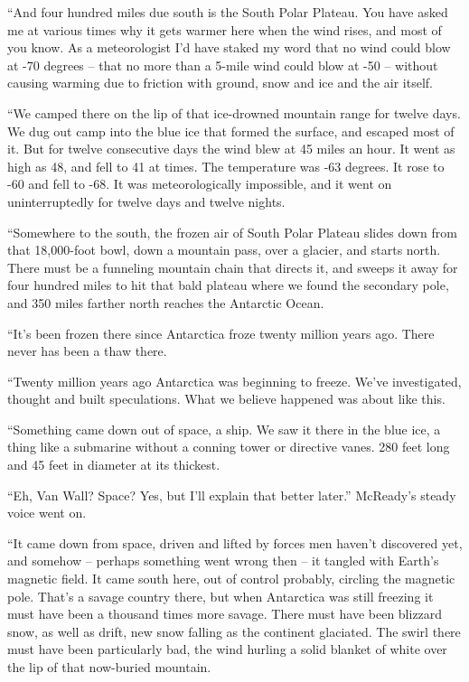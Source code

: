 \documentclass[letterpaper,openany,12pt]{memoir}		%
\begin{document}
``And four hundred miles due south is the South Polar Plateau. You have asked me
at various times why it gets warmer here when the wind rises, and most of you
know. As a meteorologist I'd have staked my word that no wind could blow at -70
degrees -- that no more than a 5-mile wind could blow at -50 -- without causing
warming due to friction with ground, snow and ice and the air itself.

``We camped there on the lip of that ice-drowned mountain range for twelve days.
We dug out camp into the blue ice that formed the surface, and escaped most of
it. But for twelve consecutive days the wind blew at 45 miles an hour. It went
as high as 48, and fell to 41 at times. The temperature was -63 degrees. It rose
to -60 and fell to -68. It was meteorologically impossible, and it went on
uninterruptedly for twelve days and twelve nights.

``Somewhere to the south, the frozen air of South Polar Plateau slides down from
that 18,000-foot bowl, down a mountain pass, over a glacier, and starts north.
There must be a funneling mountain chain that directs it, and sweeps it away for
four hundred miles to hit that bald plateau where we found the secondary pole,
and 350 miles farther north reaches the Antarctic Ocean.

``It's been frozen there since Antarctica froze twenty million years ago. There
never has been a thaw there.

``Twenty million years ago Antarctica was beginning to freeze. We've
investigated, thought and built speculations. What we believe happened was about
like this.

``Something came down out of space, a ship. We saw it there in the blue ice, a
thing like a submarine without a conning tower or directive vanes. 280 feet long
and 45 feet in diameter at its thickest.

``Eh, Van Wall? Space? Yes, but I'll explain that better later.'' McReady's
steady voice went on.

``It came down from space, driven and lifted by forces men haven't discovered
yet, and somehow -- perhaps something went wrong then -- it tangled with Earth's
magnetic field. It came south here, out of control probably, circling the
magnetic pole. That's a savage country there, but when Antarctica was still
freezing it must have been a thousand times more savage. There must have been
blizzard snow, as well as drift, new snow falling as the continent glaciated.
The swirl there must have been particularly bad, the wind hurling a solid
blanket of white over the lip of that now-buried mountain.
\end{document}
